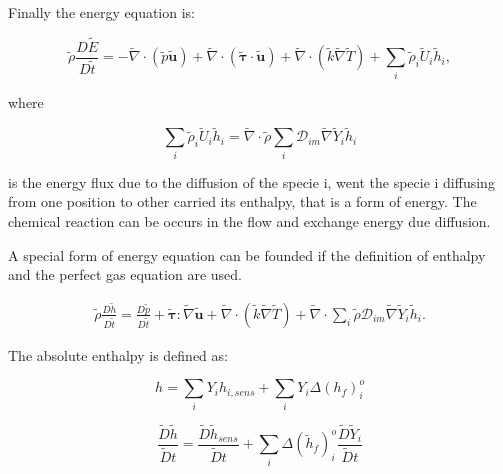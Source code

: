\documentclass[preprint,12pt,authoryear]{elsarticle}
\begin{document}
Finally the energy equation is:

\begin{equation}
        \tilde{\rho}\frac{D \tilde{E} }{D \tilde{t}}
=       - 
        \tilde{\nabla} \cdot (\tilde{p} \tilde{\mathbf{u}})
        + 
        \tilde{\nabla} \cdot (\pmb{\tilde{\tau}}\cdot\tilde{\mathbf{u}}) 
        + 
        \tilde{\nabla} \cdot (\tilde{k}\tilde{\nabla} \tilde{T}) 
        + 
        \sum\limits_i \tilde{\rho}_i\tilde{U}_i\tilde{h}_i
  ,
\label{eq:E}  
\end{equation}

where 

\begin{equation}
        \sum\limits_i \tilde{\rho}_i\tilde{U}_i\tilde{h}_i
        =
        \tilde{\nabla} \cdot
        \tilde{\rho}
        \sum\limits_i 
        \mathcal{D}_{im}\tilde{\nabla}\tilde{Y}_i     
        \tilde{h}_i
\end{equation}

is the energy flux due to the diffusion of the specie i, went 
the specie i diffusing from one position to other 
carried its enthalpy, that is a form of energy. 
The chemical reaction can be occurs in the flow 
and exchange energy  due diffusion. 

A special form of energy equation can be founded if the definition of
enthalpy and the perfect gas equation are used. 


\begin{equation}
\begin{split}
        \tilde{\rho}\frac{D  \tilde{h}}{D\tilde{t}}
=
        \frac{D \tilde{p}}{D\tilde{t}}
+       
        \pmb{\tilde{\tau}}:\tilde{\nabla} \tilde{\mathbf{u}} 
+ 
        \tilde{\nabla} \cdot (\tilde{k}\tilde{\nabla} \tilde{T})
+
        \tilde{\nabla} \cdot
        \sum\limits_i 
        \tilde{\rho}\mathcal{D}_{im}\tilde{\nabla}\tilde{Y}_i     
        \tilde{h}_i.
\end{split}
\end{equation}

The absolute enthalpy is defined as:

\begin{equation}
	h=\sum_iY_ih_{i,sens}+\sum_iY_i\Delta(h_f)_i^o
\end{equation}

\begin{equation}
	\frac{\tilde{D} \tilde{h}}{\tilde{D} t}
	=
	\frac{\tilde{D}\tilde{h}_{sens}}{\tilde{D}t}
	+
	\sum_i\Delta(\tilde{h}_f)_i^o
	\frac{\tilde{D}\tilde{Y}_i}{\tilde{D}t}
\end{equation}
\end{document}
